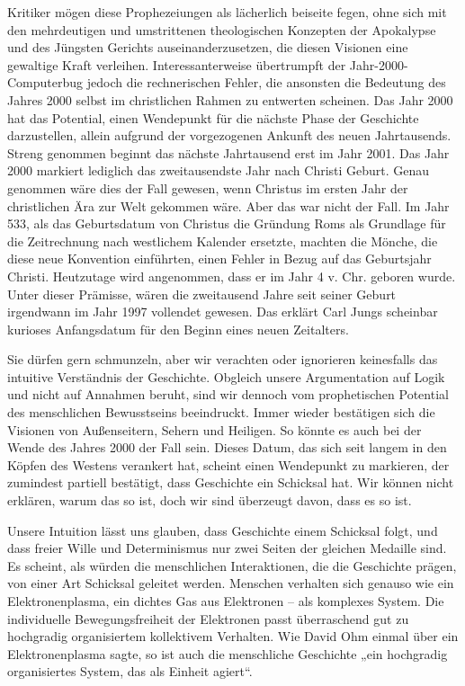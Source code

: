 \documentclass[
  a5paper,
  smalldemyvopaper,10pt,twoside,onecolumn,openright,extrafontsizes,hidelinks]{memoir}
\begin{document}
Kritiker mögen diese Prophezeiungen als lächerlich beiseite fegen, ohne
sich mit den mehrdeutigen und umstrittenen theologischen Konzepten der
Apokalypse und des Jüngsten Gerichts auseinanderzusetzen, die diesen
Visionen eine gewaltige Kraft verleihen. Interessanterweise übertrumpft
der Jahr-2000-Computerbug jedoch die rechnerischen Fehler, die ansonsten
die Bedeutung des Jahres 2000 selbst im christlichen Rahmen zu entwerten
scheinen. Das Jahr 2000 hat das Potential, einen Wendepunkt für die
nächste Phase der Geschichte darzustellen, allein aufgrund der
vorgezogenen Ankunft des neuen Jahrtausends. Streng genommen beginnt das
nächste Jahrtausend erst im Jahr 2001. Das Jahr 2000 markiert lediglich
das zweitausendste Jahr nach Christi Geburt. Genau genommen wäre dies
der Fall gewesen, wenn Christus im ersten Jahr der christlichen Ära zur
Welt gekommen wäre. Aber das war nicht der Fall. Im Jahr 533, als das
Geburtsdatum von Christus die Gründung Roms als Grundlage für die
Zeitrechnung nach westlichem Kalender ersetzte, machten die Mönche, die
diese neue Konvention einführten, einen Fehler in Bezug auf das
Geburtsjahr Christi. Heutzutage wird angenommen, dass er im Jahr 4 v.
Chr. geboren wurde. Unter dieser Prämisse, wären die zweitausend Jahre
seit seiner Geburt irgendwann im Jahr 1997 vollendet gewesen. Das
erklärt Carl Jungs scheinbar kurioses Anfangsdatum für den Beginn eines
neuen Zeitalters.

Sie dürfen gern schmunzeln, aber wir verachten oder ignorieren
keinesfalls das intuitive Verständnis der Geschichte. Obgleich unsere
Argumentation auf Logik und nicht auf Annahmen beruht, sind wir dennoch
vom prophetischen Potential des menschlichen Bewusstseins beeindruckt.
Immer wieder bestätigen sich die Visionen von Außenseitern, Sehern und
Heiligen. So könnte es auch bei der Wende des Jahres 2000 der Fall sein.
Dieses Datum, das sich seit langem in den Köpfen des Westens verankert
hat, scheint einen Wendepunkt zu markieren, der zumindest partiell
bestätigt, dass Geschichte ein Schicksal hat. Wir können nicht erklären,
warum das so ist, doch wir sind überzeugt davon, dass es so ist.

Unsere Intuition lässt uns glauben, dass Geschichte einem Schicksal
folgt, und dass freier Wille und Determinismus nur zwei Seiten der
gleichen Medaille sind. Es scheint, als würden die menschlichen
Interaktionen, die die Geschichte prägen, von einer Art Schicksal
geleitet werden. Menschen verhalten sich genauso wie ein
Elektronenplasma, ein dichtes Gas aus Elektronen -- als komplexes
System. Die individuelle Bewegungsfreiheit der Elektronen passt
überraschend gut zu hochgradig organisiertem kollektivem Verhalten. Wie
David Ohm einmal über ein Elektronenplasma sagte, so ist auch die
menschliche Geschichte „ein hochgradig organisiertes System, das als
Einheit agiert``.
\end{document}
